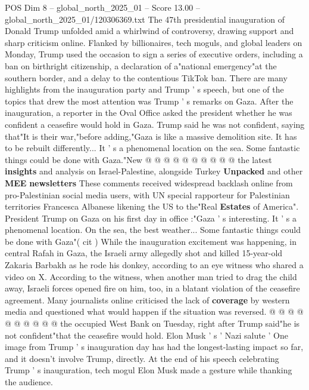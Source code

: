 \begin{textsample}{POS Dim 8 – global\_north\_2025\_01 – Score 13.00 – global\_north\_2025\_01/120306369.txt}  \label{ex:f8_pos_108}
The 47th presidential inauguration of Donald Trump unfolded amid a whirlwind of controversy, drawing support and sharp criticism online.
Flanked by billionaires, tech moguls, and global leaders on Monday, Trump used the occasion to sign a series of executive orders, including a ban on birthright citizenship, a declaration of a"national emergency"at the southern border, and a delay to the contentious TikTok ban.
There are many highlights from the inauguration party and Trump ' s speech, but one of the topics that drew the most attention was Trump ' s remarks on Gaza.
After the inauguration, a reporter in the Oval Office asked the president whether he was confident a ceasefire would hold in Gaza.
Trump said he was not confident, saying that"It is their war,"before adding,"Gaza is like a massive demolition site.
It has to be rebuilt differently...
It ' s a phenomenal location on the sea.
Some fantastic things could be done with Gaza."New @ @ @ @ @ @ @ @ @ @ the latest \textbf{insights} and analysis on Israel-Palestine, alongside Turkey \textbf{Unpacked} and other \textbf{MEE} \textbf{newsletters} These comments received widespread backlash online from pro-Palestinian social media users, with UN special rapporteur for Palestinian territories Francesca Albanese likening the US to the"Real \textbf{Estates} of America".
President Trump on Gaza on his first day in office :"Gaza ' s interesting.
It ' s a phenomenal location.
On the sea, the best weather...
Some fantastic things could be done with Gaza"( cit ) While the inauguration excitement was happening, in central Rafah in Gaza, the Israeli army allegedly shot and killed 15-year-old Zakaria Barbakh as he rode his donkey, according to an eye witness who shared a video on X.
According to the witness, when another man tried to drag the child away, Israeli forces opened fire on him, too, in a blatant violation of the ceasefire agreement.
Many journalists online criticised the lack of \textbf{coverage} by western media and questioned what would happen if the situation was reversed. @ @ @ @ @ @ @ @ @ @ the occupied West Bank on Tuesday, right after Trump said"he is not confident"that the ceasefire would hold.
Elon Musk ' s ' Nazi salute ' One image from Trump ' s inauguration day has had the longest-lasting impact so far, and it doesn't involve Trump, directly.
At the end of his speech celebrating Trump ' s inauguration, tech mogul Elon Musk made a gesture while thanking the audience.

\end{textsample}

